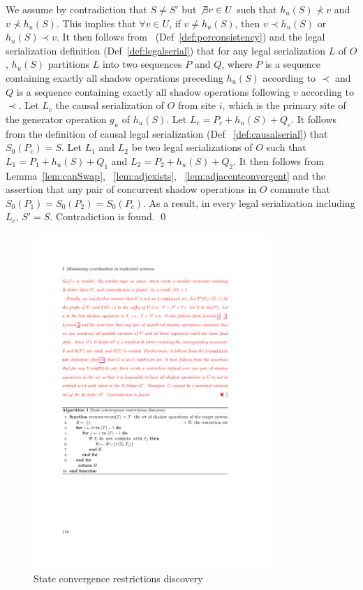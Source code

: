 We assume by contradiction that $S \neq S'$ but $\not\exists v\in U$ such that $h_u(S)\not\prec v$ and $v\not\prec h_u(S)$. This implies
that $\forall v \in U$, if $v \neq h_u(S)$, then $v \prec h_u(S)$ or $h_u(S) \prec v$. It then follows from \PRCN\ (Def~\ref{def:porconsistency})
and the legal serialization definition (Def~\ref{def:legalserial}) that for any legal serialization $L$ of $O$, $h_u(S)$ partitions
$L$ into two sequences $P$ and $Q$, where $P$ is a sequence containing exactly all shadow operations preceding $h_u(S)$ according to $\prec$ 
and $Q$ is a sequence containing exactly all shadow operations following $v$ according to $\prec$. 
Let $L_{c}$ the causal serialization of $O$ from site $i$, which is the primary site of the generator operation $g_u$ of $h_u(S)$. 
Let $L_c = P_c + h_u(S) + Q_c$. It follows from the definition of causal legal serialization (Def ~\ref{def:causalserial}) that $S_0(P_c) = S$.
Let $L_1$ and $L_2$ be two legal serializations of $O$ such that $L_1 = P_1 + h_u(S) + Q_1$ and $L_2 = P_2 + h_u(S) + Q_2$. 
It then follows from Lemma~\ref{lem:canSwap}, ~\ref{lem:adjexists}, ~\ref{lem:adjacentconvergent}
and the assertion that any pair of concurrent shadow operations in $O$ commute that $S_0(P_1) = S_0(P_2) = S_0(P_c)$. 
As a result, in every legal serialization including $L_c$, $S' = S$. Contradiction is found.
 \qed
\fi



\begin{figure}[th!]
\centering
\includegraphics[width=0.8\textwidth]{figures/algs/alg1.pdf}
\caption{State convergence restrictions discovery}
\label{alg:scdiscover}
\end{figure}


